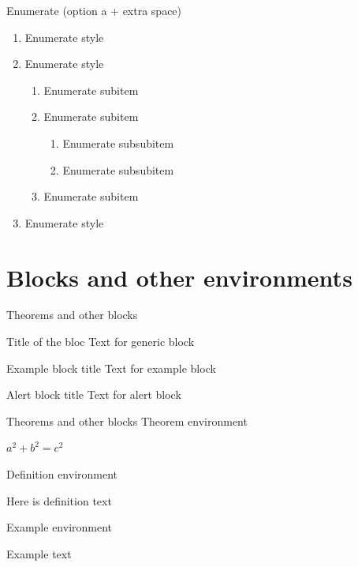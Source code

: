 \documentclass[11pt,t]{beamer}
\begin{document}
\begin{frame}{Enumerate}
(option a + extra space)
\begin{enumerate}[a\enspace]
	\item Enumerate style
	\item Enumerate style
	\begin{enumerate}[a\enspace]
		\item Enumerate subitem
		\item Enumerate subitem
		\begin{enumerate}[a\enspace]
			\item Enumerate subsubitem
			\item Enumerate subsubitem
		\end{enumerate}
		\item Enumerate subitem
	\end{enumerate}
	\item Enumerate style
\end{enumerate}
\end{frame}








\section{Blocks and other environments}	\label{sec:blocks}
\begin{frame}{Theorems and other blocks}
	\begin{block}{Title of the bloc}
	Text for generic block
	\end{block}

\vspace{11pt}
	\begin{exampleblock}{Example block title}
	Text for example block
	\end{exampleblock}

\vspace{11pt}
	\begin{alertblock}{Alert block title}
	Text for alert block
	\end{alertblock}
\end{frame}




\begin{frame}{Theorems and other blocks}
Theorem environment
	\begin{theorem}
		$a^2 + b^2 = c^2$
	\end{theorem}

\vspace{11pt}
Definition environment
	\begin{definition}
		Here is definition text
	\end{definition}

\vspace{11pt}	
Example environment
	\begin{example}
		Example text
	\end{example}
\end{frame}
\end{document}
